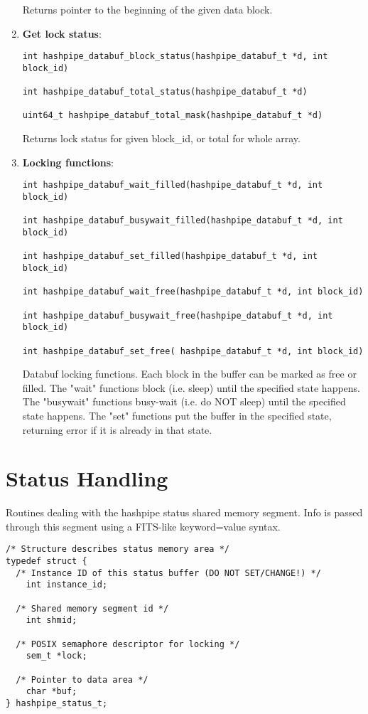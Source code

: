\documentclass[12pt]{article}
\begin{document}
\begin{enumerate}
Returns pointer to the beginning of the given data block.

\item {\bf Get lock status}:

\begin{lstlisting}
int hashpipe_databuf_block_status(hashpipe_databuf_t *d, int block_id)

int hashpipe_databuf_total_status(hashpipe_databuf_t *d)

uint64_t hashpipe_databuf_total_mask(hashpipe_databuf_t *d)
\end{lstlisting}

Returns lock status for given block\_id, or total for whole array.

\item {\bf Locking functions}:

\begin{lstlisting}
int hashpipe_databuf_wait_filled(hashpipe_databuf_t *d, int block_id)

int hashpipe_databuf_busywait_filled(hashpipe_databuf_t *d, int block_id)

int hashpipe_databuf_set_filled(hashpipe_databuf_t *d, int block_id)

int hashpipe_databuf_wait_free(hashpipe_databuf_t *d, int block_id)

int hashpipe_databuf_busywait_free(hashpipe_databuf_t *d, int block_id)

int hashpipe_databuf_set_free( hashpipe_databuf_t *d, int block_id)
\end{lstlisting}

Databuf locking functions.  Each block in the buffer
can be marked as free or filled.  The "wait" functions
block (i.e. sleep) until the specified state happens.
The "busywait" functions busy-wait (i.e. do NOT sleep)
until the specified state happens.  The "set" functions
put the buffer in the specified state, returning error if
it is already in that state.

\end{enumerate}

\section{Status Handling}
Routines dealing with the hashpipe status shared memory
segment.  Info is passed through this segment using
a FITS-like keyword=value syntax.

\begin{centering}
\begin{lstlisting}
/* Structure describes status memory area */
typedef struct {
  /* Instance ID of this status buffer (DO NOT SET/CHANGE!) */
    int instance_id;

  /* Shared memory segment id */
    int shmid;

  /* POSIX semaphore descriptor for locking */
    sem_t *lock;

  /* Pointer to data area */
    char *buf; 
} hashpipe_status_t;
\end{lstlisting}
\end{centering}
\end{document}
